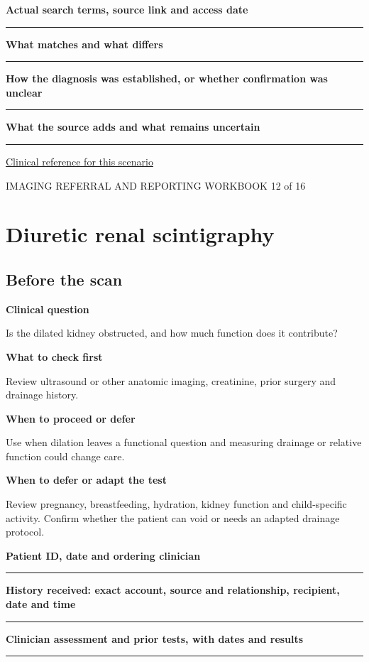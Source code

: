 \documentclass[11pt,a4paper]{article}
\newcommand{\record}[1]{\textbf{#1}\par\vspace{0.55\baselineskip}\hrule\vspace{0.35\baselineskip}}
\begin{document}
\record{Actual search terms, source link and access date}

\record{What matches and what differs}

\record{How the diagnosis was established, or whether confirmation was unclear}

\record{What the source adds and what remains uncertain}

\small\href{https://www.radiologyinfo.org/en/info/acs-right-upper-quadrant-pain}{Clinical reference for this scenario}

\normalsize

\newpage

{\small IMAGING REFERRAL AND REPORTING WORKBOOK \hfill 12 of 16}

\section*{Diuretic renal scintigraphy}

\subsection*{Before the scan}

\textbf{Clinical question}\par Is the dilated kidney obstructed, and how much function does it contribute?\par

\textbf{What to check first}\par Review ultrasound or other anatomic imaging, creatinine, prior surgery and drainage history.\par

\textbf{When to proceed or defer}\par Use when dilation leaves a functional question and measuring drainage or relative function could change care.\par

\textbf{When to defer or adapt the test}\par Review pregnancy, breastfeeding, hydration, kidney function and child-specific activity. Confirm whether the patient can void or needs an adapted drainage protocol.\par

\record{Patient ID, date and ordering clinician}

\record{History received: exact account, source and relationship, recipient, date and time}

\record{Clinician assessment and prior tests, with dates and results}
\end{document}
